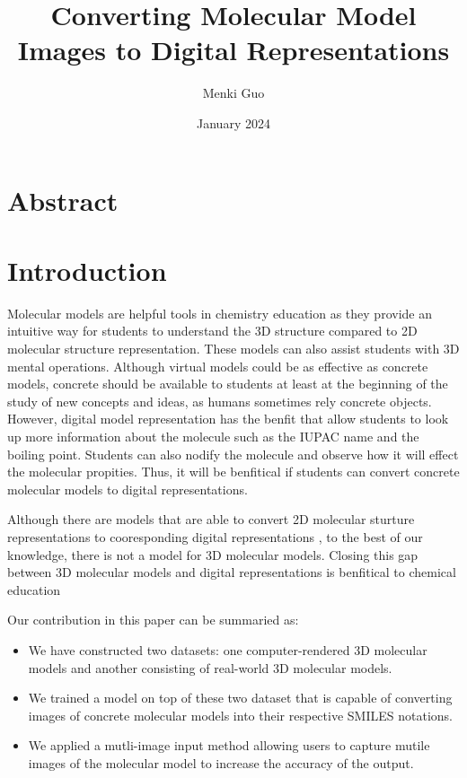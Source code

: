 \documentclass{article}
\title{Converting Molecular Model Images to Digital Representations}
\author{Menki Guo}
\date{January 2024}
\begin{document}
\maketitle
\section*{Abstract}
 
\section{Introduction}
Molecular models are helpful tools in chemistry education as they provide an intuitive way for students to understand the 3D structure compared to 2D molecular structure representation. These models can also assist students with 3D mental operations. Although virtual models could be as effective as concrete models, concrete should be available to students at least at the beginning of the study of new concepts and ideas, as humans sometimes rely concrete objects.\cite{savec_evaluating_2005} However, digital model representation has the benfit that allow students to look up more information about the molecule such as the IUPAC name and the boiling point. Students can also nodify the molecule and observe how it will effect the molecular propities. Thus, it will be benfitical if students can convert concrete molecular models to digital representations. 

Although there are models that are able to convert 2D molecular sturture representations to cooresponding digital representations \cite{swinocsr}\cite{decimer}\cite{chempix}, to the best of our knowledge, there is not a model for 3D molecular models. Closing this gap between 3D molecular models and digital representations is benfitical to chemical education 

Our contribution in this paper can be summaried as:
\begin{itemize}
\item We have constructed two datasets: one computer-rendered 3D molecular models and another consisting of real-world 3D molecular models.
\item We trained a model on top of these two dataset that is capable of converting images of concrete molecular models into their respective SMILES notations. 
\item We applied a mutli-image input method allowing users to capture mutile images of the molecular model to increase the accuracy of the output.
\end{itemize}
\end{document}
